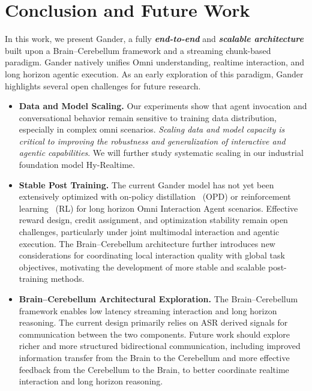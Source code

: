 \section{Conclusion and Future Work}


In this work, we present Gander, a fully \textbf{\textit{end-to-end}} and \textbf{\textit{scalable architecture}} built upon a Brain–Cerebellum framework and a streaming chunk-based paradigm. Gander natively unifies Omni understanding, realtime interaction, and long horizon agentic execution. As an early exploration of this paradigm, Gander highlights several open challenges for future research.

\begin{itemize}

\item \textbf{Data and Model Scaling.} Our experiments show that agent invocation and conversational behavior remain sensitive to training data distribution, especially in complex omni scenarios. \textit{Scaling data and model capacity is critical to improving the robustness and generalization of interactive and agentic capabilities}. We will further study systematic scaling in our industrial foundation model Hy-Realtime.

\item \textbf{Stable Post Training.} The current Gander model has not yet been extensively optimized with on-policy distillation~\cite{xopd,x3opd} (OPD) or reinforcement learning~\cite{shao2024deepseekmath,chen2026wavalign,ji2025wavreward,dualreasoner} (RL) for long horizon Omni Interaction Agent scenarios. Effective reward design, credit assignment, and optimization stability remain open challenges, particularly under joint multimodal interaction and agentic execution. The Brain–Cerebellum architecture further introduces new considerations for coordinating local interaction quality with global task objectives, motivating the development of more stable and scalable post-training methods.

 
\item \textbf{Brain–Cerebellum Architectural Exploration.} The Brain–Cerebellum framework enables low latency streaming interaction and long horizon reasoning. The current design primarily relies on ASR derived signals for communication between the two components. Future work should explore richer and more structured bidirectional communication, including improved information transfer from the Brain to the Cerebellum and more effective feedback from the Cerebellum to the Brain, to better coordinate realtime interaction and long horizon reasoning.


\end{itemize}
